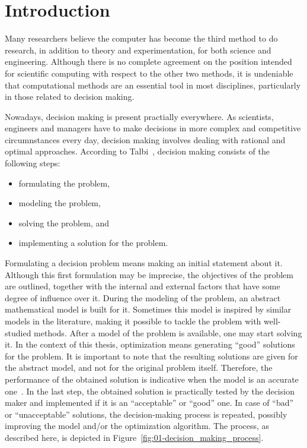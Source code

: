 
\chapter{Introduction \label{chap:01-Introduction}}


\noindent Many researchers believe the computer has become the third
method to do research, in addition to theory and experimentation,
for both science and engineering. Although there is no complete agreement
on the position intended for scientific computing with respect to
the other two methods, it is undeniable that computational methods
are an essential tool in most disciplines, particularly in those related
to decision making.

Nowadays, decision making is present practially everywhere. As scientists,
engineers and managers have to make decisions in more complex and
competitive circumnstances every day, decision making involves dealing
with rational and optimal approaches. According to Talbi~\cite{Talbi_Metaheuristics:2009},
decision making consists of the following steps:
\begin{itemize}
\item formulating the problem,
\item modeling the problem, 
\item solving the problem, and
\item implementing a solution for the problem.
\end{itemize}
Formulating a decision problem means making an initial statement about
it. Although this first formulation may be imprecise, the objectives
of the problem are outlined, together with the internal and external
factors that have some degree of influence over it. During the modeling
of the problem, an abstract mathematical model is built for it. Sometimes
this model is inspired by similar models in the literature, making
it possible to tackle the problem with well-studied methods. After
a model of the problem is available, one may start solving it. In
the context of this thesis, optimization means generating ``good''
solutions for the problem. It is important to note that the resulting
solutions are given for the abstract model, and not for the original
problem itself. Therefore, the performance of the obtained solution
is indicative when the model is an accurate one~\cite{Talbi_Metaheuristics:2009}.
In the last step, the obtained solution is practically tested by the
decision maker and implemented if it is an ``acceptable'' or ``good''
one. In case of ``bad'' or ``unacceptable'' solutions, the decision-making
process is repeated, possibly improving the model and/or the optimization
algorithm. The process, as described here, is depicted in Figure~\ref{fig:01-decision_making_process}.

